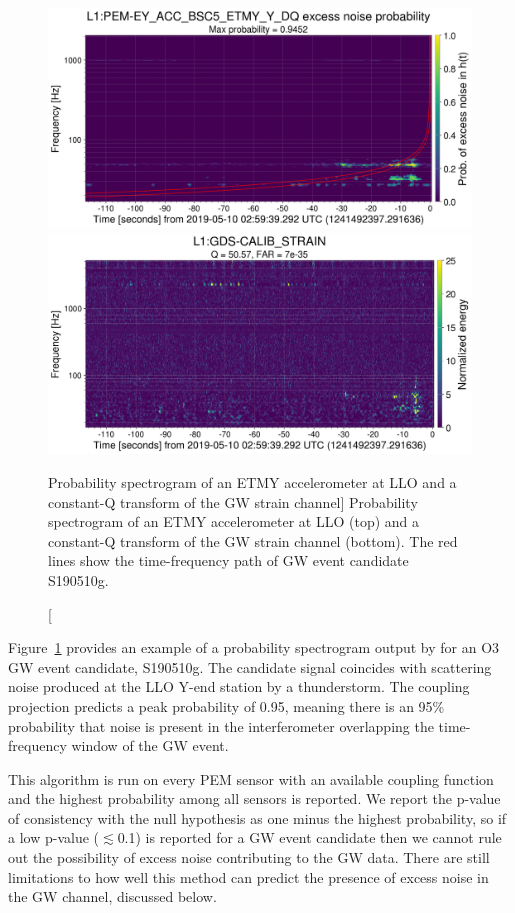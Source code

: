 \begin{figure}
	\includegraphics[width=\textwidth]{figures/noise-studies/vetting-spectrogram1.png}
	\includegraphics[width=\textwidth]{figures/noise-studies/vetting-spectrogram2.png}
	\caption
	[Probability spectrogram of an ETMY accelerometer at LLO and a constant-Q transform of the GW strain channel]
	{
		Probability spectrogram of an ETMY accelerometer at LLO (top) and a constant-Q transform of the GW strain channel (bottom).
		The red lines show the time-frequency path of GW event candidate S190510g.}
	\label{fig:vetting-spectrograms}
\end{figure}

Figure~\ref{fig:vetting-spectrograms} provides an example of a probability spectrogram output by  for an \ac{O3} \ac{GW} event candidate, S190510g.
The candidate signal coincides with scattering noise produced at the \ac{LLO} Y-end station by a thunderstorm.
The coupling projection predicts a peak probability of 0.95, meaning there is an 95\% probability that noise is present in the interferometer overlapping the time-frequency window of the \ac{GW} event.

This algorithm is run on every \ac{PEM} sensor with an available coupling function and the highest probability among all sensors is reported.
We report the p-value of consistency with the null hypothesis as one minus the highest probability, so if a low p-value ($\lesssim$0.1) is reported for a GW event candidate then we cannot rule out the possibility of excess noise contributing to the GW data.
There are still limitations to how well this method can predict the presence of excess noise in the \ac{GW} channel, discussed below.

